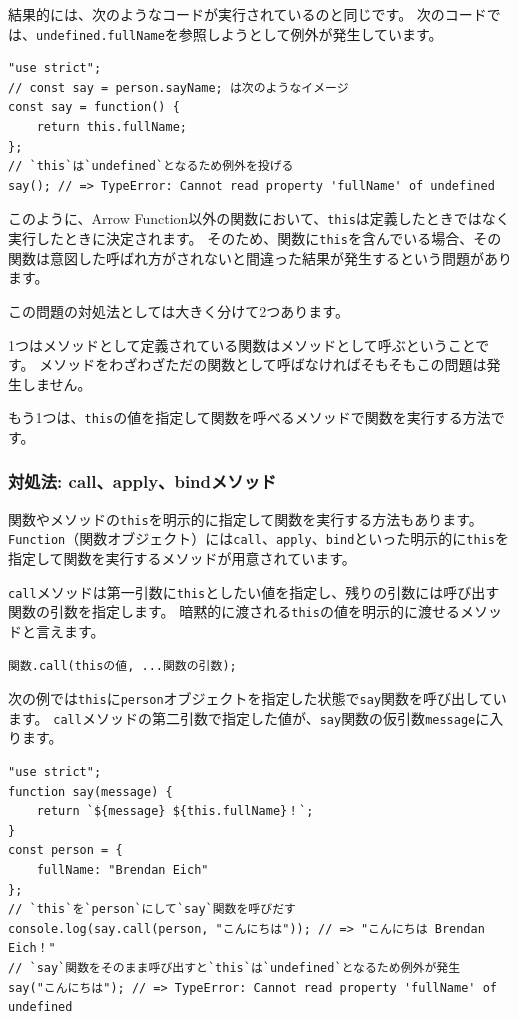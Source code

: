 結果的には、次のようなコードが実行されているのと同じです。
次のコードでは、\texttt{undefined.fullName}を参照しようとして例外が発生しています。

\begin{lstlisting}
"use strict";
// const say = person.sayName; は次のようなイメージ
const say = function() {
    return this.fullName;
};
// `this`は`undefined`となるため例外を投げる
say(); // => TypeError: Cannot read property 'fullName' of undefined
\end{lstlisting}

このように、Arrow
Function以外の関数において、\texttt{this}は定義したときではなく実行したときに決定されます。
そのため、関数に\texttt{this}を含んでいる場合、その関数は意図した呼ばれ方がされないと間違った結果が発生するという問題があります。

この問題の対処法としては大きく分けて2つあります。

1つはメソッドとして定義されている関数はメソッドとして呼ぶということです。
メソッドをわざわざただの関数として呼ばなければそもそもこの問題は発生しません。

もう1つは、\texttt{this}の値を指定して関数を呼べるメソッドで関数を実行する方法です。

\hypertarget{call-apply-bind}{%
\subsubsection{対処法:
call、apply、bindメソッド}\label{call-apply-bind}}

関数やメソッドの\texttt{this}を明示的に指定して関数を実行する方法もあります。
\texttt{Function}（関数オブジェクト）には\texttt{call}、\texttt{apply}、\texttt{bind}といった明示的に\texttt{this}を指定して関数を実行するメソッドが用意されています。

\texttt{call}メソッドは第一引数に\texttt{this}としたい値を指定し、残りの引数には呼び出す関数の引数を指定します。
暗黙的に渡される\texttt{this}の値を明示的に渡せるメソッドと言えます。

\begin{lstlisting}
関数.call(thisの値, ...関数の引数);
\end{lstlisting}

次の例では\texttt{this}に\texttt{person}オブジェクトを指定した状態で\texttt{say}関数を呼び出しています。
\texttt{call}メソッドの第二引数で指定した値が、\texttt{say}関数の仮引数\texttt{message}に入ります。

\begin{lstlisting}
"use strict";
function say(message) {
    return `${message} ${this.fullName}！`;
}
const person = {
    fullName: "Brendan Eich"
};
// `this`を`person`にして`say`関数を呼びだす
console.log(say.call(person, "こんにちは")); // => "こんにちは Brendan Eich！"
// `say`関数をそのまま呼び出すと`this`は`undefined`となるため例外が発生
say("こんにちは"); // => TypeError: Cannot read property 'fullName' of undefined
\end{lstlisting}

